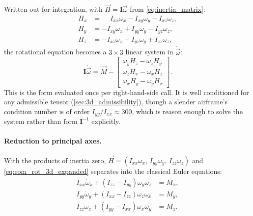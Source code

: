 Written out for integration, with $\vec{H}=\mathbf{I}\vec\omega$ from
\autoref{eq:inertia_matrix}:
\begin{equation} \label{eq:eom_momentum_3d}
    \begin{aligned}
        H_x &= \phantom{-}I_{xx}\omega_x - I_{xy}\omega_y - I_{xz}\omega_z, \\
        H_y &= -I_{xy}\omega_x + I_{yy}\omega_y - I_{yz}\omega_z, \\
        H_z &= -I_{xz}\omega_x - I_{yz}\omega_y + I_{zz}\omega_z,
    \end{aligned}
\end{equation}
the rotational equation becomes a $3\times3$ linear system in $\dot{\vec\omega}$:
\begin{equation} \label{eq:eom_rot_3d_expanded}
    \mathbf{I}\dot{\vec\omega} = \vec{M} - \begin{bmatrix}
        \omega_yH_z - \omega_zH_y \\ \omega_zH_x - \omega_xH_z \\ \omega_xH_y - \omega_yH_x
    \end{bmatrix}.
\end{equation}
This is the form evaluated once per right-hand-side call. It is well conditioned for any admissible
tensor (\autoref{sec:3d_admissibility}), though a slender airframe's condition number is of order
$I_{yy}/I_{xx}\approx300$, which is reason enough to solve the system rather than form
$\mathbf{I}^{-1}$ explicitly.

\paragraph{Reduction to principal axes.} With the products of inertia zero,
$\vec{H}=(I_{xx}\omega_x,\,I_{yy}\omega_y,\,I_{zz}\omega_z)$ and
\autoref{eq:eom_rot_3d_expanded} separates into the classical Euler equations:
\begin{equation} \label{eq:eom_rot_3d_diag}
    \begin{aligned}
        I_{xx}\dot\omega_x + \left(I_{zz}-I_{yy}\right)\omega_y\omega_z &= M_x, \\
        I_{yy}\dot\omega_y + \left(I_{xx}-I_{zz}\right)\omega_z\omega_x &= M_y, \\
        I_{zz}\dot\omega_z + \left(I_{yy}-I_{xx}\right)\omega_x\omega_y &= M_z.
    \end{aligned}
\end{equation}

